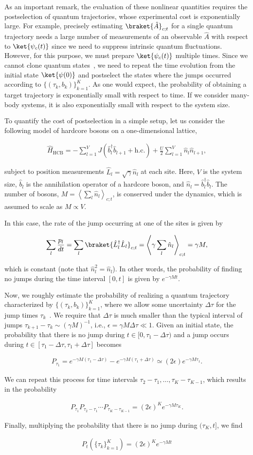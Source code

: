 \documentclass[preprint,pteplogo]{ptephy_v2}%
\numberwithin{equation}{section}
\theoremstyle{definition}
\newcommand{\mr}[1]{\mathrm{#1}}
\newcommand{\braketL}[1]{\left\langle #1 \right\rangle}
\newcommand{\aln}[1]{
\begin{align}
#1
\end{align}
}
\begin{document}
As an important remark, the evaluation of these nonlinear quantities requires the postselection of quantum trajectories, whose experimental cost is exponentially large. 
For example, precisely estimating $\braket{\hat{A}}_{c;t}$ for a single quantum trajectory needs a large number of measurements of an observable $\hat{A}$ with respect to $\ket{\psi_c(t)}$ since we need to suppress intrinsic quantum fluctuations.
However, for this purpose, we must prepare $\ket{\psi_c(t)}$ multiple times.
Since we cannot clone quantum states~\cite{wootters1982single}, we need to repeat the time evolution from the initial state $\ket{\psi(0)}$ and postselect the states where the jumps occurred according to $\{(\tau_k,b_k)\}_{k=1}^K$.
As one would expect, the probability of obtaining a target trajectory is exponentially small with respect to time. 
If we consider many-body systems, it is also exponentially small with respect to the system size.

To quantify the cost of postselection in a simple setup, let us consider the following model of hardcore bosons on a one-dimensional lattice,
\aln{\label{hcboson}
\hat{H}_\mr{HCB}=-\sum_{l=1}^VJ(\hat{b}^\dag_l\hat{b}_{l+1}+\mr{h.c.})+\frac{U}{2}\sum_{l=1}^V \hat{n}_l\hat{n}_{l+1},
}
subject to position measurements $\hat{L}_l=\sqrt{\gamma}\hat{n}_l$ at each site.
Here, $V$ is the system size, $\hat{b}_l$ is the annihilation operator of a hardcore boson, and $\hat{n}_l=\hat{b}_l^\dag\hat{b}_l$.
The number of bosons, $M=\left<\sum_l\hat{n}_l\right>_{c;t}$, is conserved under the dynamics, which is assumed to scale as $M\propto V$.

In this case, the rate of the jump occurring at one of the sites is given by
\aln{
\sum_l\frac{p_l}{dt}=\sum_l\braket{\hat{L}_l^\dag\hat{L}_l}_{c;t}=\braketL{\gamma\sum_l\hat{n}_l}_{c;t}=\gamma M,
}
which is constant (note that $\hat{n}_l^2=\hat{n}_l$).
In other words, the probability of finding no jumps during the time interval $[0,t]$ is given by $e^{-\gamma M t}$.

Now, we roughly estimate the probability of realizing a quantum trajectory characterized by  $\{(\tau_k,b_k)\}_{k=1}^K$, where we allow some uncertainty $\Delta \tau$ for the jump times $\tau_k$~\cite{yamamoto2023localization}.
We require that $\Delta\tau$ is much smaller than the typical interval of jumps $\tau_{k+1}-\tau_k\sim (\gamma M)^{-1}$, i.e., $\epsilon=\gamma M\Delta\tau\ll 1$.
Given an initial state, the probability that there is no jump during $t\in[0,\tau_1-\Delta\tau)$ and a jump occurs during $t\in[\tau_1-\Delta\tau,\tau_1+\Delta\tau]$ becomes
\aln{
P_{\tau_1}=e^{-\gamma M(\tau_1-\Delta\tau)}-e^{-\gamma M(\tau_1+\Delta\tau)}\simeq (2\epsilon)e^{-\gamma M \tau_1}.
}
We can repeat this process for time intervals $\tau_2-\tau_1, \dots, \tau_K-\tau_{K-1}$, which results in the probability 
\aln{
P_{\tau_1}P_{\tau_2-\tau_1} \cdots P_{\tau_K-\tau_{K-1}}=(2\epsilon)^Ke^{-\gamma M\tau_K}.
}
Finally, multiplying the probability that there is no jump during $(\tau_K,t]$, we find
\aln{
P_t(\{\tau_k\}_{k=1}^K)=(2\epsilon)^Ke^{-\gamma Mt}
}
\end{document}

